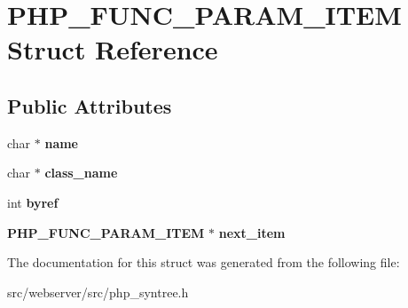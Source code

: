 \section{PHP\_\-FUNC\_\-PARAM\_\-ITEM Struct Reference}
\label{structPHP__FUNC__PARAM__ITEM}
\subsection*{Public Attributes}
\begin{DoxyCompactItemize}
\item 
char $\ast$ {\bfseries name}\label{structPHP__FUNC__PARAM__ITEM_acf8f0a80a49753a19f7771dcb956882a}

\item 
char $\ast$ {\bfseries class\_\-name}\label{structPHP__FUNC__PARAM__ITEM_a7540c02ba75fe67355337668238c1821}

\item 
int {\bfseries byref}\label{structPHP__FUNC__PARAM__ITEM_a1308dec75144ea7d64b8ac873e240b39}

\item 
{\bf PHP\_\-FUNC\_\-PARAM\_\-ITEM} $\ast$ {\bfseries next\_\-item}\label{structPHP__FUNC__PARAM__ITEM_a8459749d437fd7873b5b9db94bdd9995}

\end{DoxyCompactItemize}


The documentation for this struct was generated from the following file:\begin{DoxyCompactItemize}
\item 
src/webserver/src/php\_\-syntree.h\end{DoxyCompactItemize}
